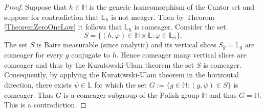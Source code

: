\documentclass[10pt,a4paper]{amsart}
\begin{document}
\begin{proof}
Suppose that $h\in\mathbb H$ is the generic homeomorphism of the Cantor set and suppose for contradiction that $\mathbb L_h$ is not meager. Then by Theorem \ref{TheoremZeroOneLaw} it follows that $\mathbb L_h$ is comeager.
Consider the set 
\[S=\{(h,\varphi)\in\mathbb H\times\mathbb L: \varphi\in\mathbb L_h\}.\]
The set $S$ is Baire measurable (since analytic)
and its vertical slices $S_g=\mathbb L_g$ are comeager for every $g$ conjugate to $h$. Hence comeager many vertical slices are comeager and thus by the Kuratowski-Ulam theorem the set $S$ is comeager.
Consequently, by applying the Kuratowski-Ulam theorem in the horizontal direction, there exists $\psi\in\mathbb L$ for which the set $G:=\{g\in\mathbb H: (g, \psi)\in S\}$ is comeager.
Thus $G$ is a comeager subgroup of the Polish group $\mathbb H$ and thus $G=\mathbb H$. This is a contradiction.
\end{proof}
\end{document}
